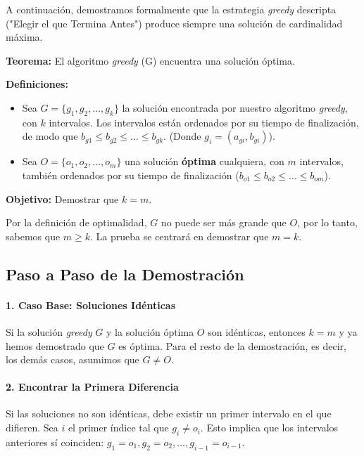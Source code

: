 \documentclass[12pt, a4paper]{article}
\begin{document}
A continuación, demostramos formalmente que la estrategia \textit{greedy} descripta 
("Elegir el que Termina Antes") produce siempre una solución de cardinalidad máxima.

\textbf{Teorema:} El algoritmo \textit{greedy} (G) encuentra una solución óptima.

\textbf{Definiciones:}
\begin{itemize}
    \item Sea $G = \{g_1, g_2, \dots, g_k\}$ la solución encontrada por nuestro algoritmo 
    \textit{greedy}, con $k$ intervalos. Los intervalos están ordenados por su tiempo de finalización, 
    de modo que $b_{g1} \le b_{g2} \le \dots \le b_{gk}$. (Donde $g_i = (a_{gi}, b_{gi})$).
    \item Sea $O = \{o_1, o_2, \dots, o_m\}$ una solución \textbf{óptima} cualquiera, con $m$ intervalos, 
    también ordenados por su tiempo de finalización ($b_{o1} \le b_{o2} \le \dots \le b_{om}$).
\end{itemize}

\textbf{Objetivo:} Demostrar que $k = m$.

Por la definición de optimalidad, $G$ no puede ser más grande que $O$, por lo tanto, sabemos que $m \ge k$. La prueba se centrará en demostrar que $m=k$.

\subsection{Paso a Paso de la Demostración}

\paragraph{1. Caso Base: Soluciones Idénticas}
Si la solución \textit{greedy} $G$ y la solución óptima $O$ son idénticas, entonces $k = m$ y 
ya hemos demostrado que $G$ es óptima. Para el resto de la demostración, es decir, los demás casos, asumimos que $G \neq O$.

\paragraph{2. Encontrar la Primera Diferencia}
Si las soluciones no son idénticas, debe existir un primer intervalo en el que difieren. 
Sea $i$ el primer índice tal que $g_i \neq o_i$.
Esto implica que los intervalos anteriores sí coinciden: $g_1 = o_1, g_2 = o_2, \dots, g_{i-1} = o_{i-1}$.
\end{document}
